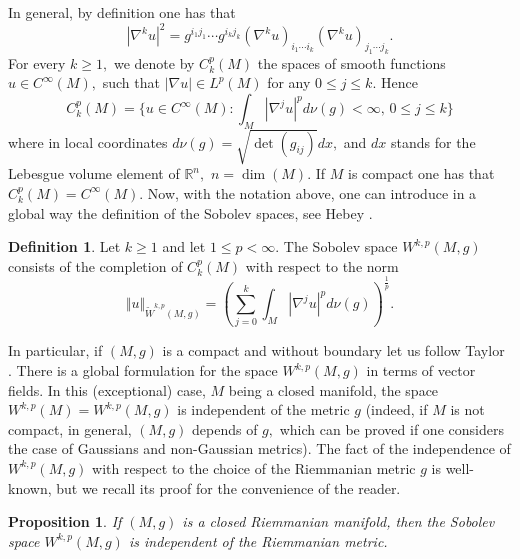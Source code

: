 \documentclass[a4paper,12pt,reqno]{amsart}%
\newtheorem{prop}[theorem]{Proposition}
\theoremstyle{definition}
\newtheorem{definition}[theorem]{Definition}
\numberwithin{equation}{section}
\numberwithin{theorem}{section}
\begin{document}
In general, by definition one has that
\begin{equation}
   |\nabla^k u|^2=g^{i_1j_1}\cdots g^{i_kj_k}(\nabla^k u)_{i_1\cdots i_k}(\nabla^k u)_{j_1\cdots j_k}. 
\end{equation} For every $k\geq 1,$ we denote by $C^{p}_{k}(M)$ the spaces of smooth functions $u\in C^\infty(M),$ such that $|\nabla u|\in L^p(M)$ for any $0\leq j\leq k.$ Hence
\[ 
   C^{p}_{k}(M)=\{u\in C^\infty(M): \int_{M}|\nabla^j u|^pd\nu(g)<\infty,\,0\leq j\leq k\} 
\]where in local coordinates $d\nu(g)=\sqrt{\det(g_{ij})}dx,$ and $dx$ stands for the Lebesgue volume element of $\mathbb{R}^n,$ $n=\dim(M).$ If $M$ is compact one has that $C^{p}_{k}(M)=C^\infty(M).$ Now, with the notation above, one can introduce in a global way the definition of the Sobolev spaces, see Hebey \cite{Hebey}. 
\begin{definition}Let $k\geq 1$ and let $1\leq p<\infty.$ The Sobolev space $W^{k,p}(M,g)$ consists of the completion of $C^{p}_{k}(M)$ with respect to the norm
\begin{equation}
    \Vert u\Vert_{\tilde{W}^{k,p}(M,g)}=\left(\sum_{j=0}^k\int_{M}|\nabla^j u|^pd\nu(g)\right)^{\frac{1}{p}}.
\end{equation}
\end{definition}
In particular, if $(M,g)$ is a compact and without boundary let us follow Taylor \cite[Page 25]{Taylorbook1981}. There is a global formulation for the space $W^{k,p}(M,g)$ in terms of vector fields. In this (exceptional) case, $M$ being a closed manifold, the space $W^{k,p}(M)=W^{k,p}(M,g)$ is independent of the metric $g$ (indeed, if $M$ is not compact, in general, $(M,g)$ depends of $g,$ which can be proved if one considers the case of  Gaussians and non-Gaussian metrics). The fact of the independence of $W^{k,p}(M,g)$ with respect to the choice of the Riemmanian metric $g$ is well-known, but we recall its proof for the convenience of the reader. 
\begin{prop} 
 If $(M,g)$ is a closed Riemmanian manifold, then the Sobolev space $W^{k,p}(M,g)$ is independent of the Riemmanian metric.
  \end{prop}  
\end{document}
